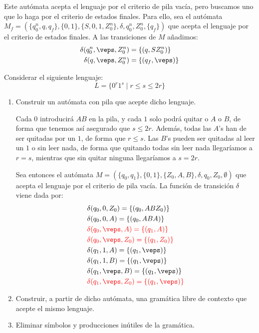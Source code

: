 \begin{ejercicio}
\begin{enumerate}
        Este autómata acepta el lenguaje por el criterio de pila vacía, pero buscamos uno que lo haga por el criterio de estados finales. Para ello, sea el autómata $M_f = (\{q_0^n, q, q_f\},\{0,1\},\{S,0,1, Z_0^n\},\delta,q_0^n,Z_0^n,\{q_f\})$ que acepta el lenguaje por el criterio de estados finales. A las transiciones de $M$ añadimos:
        \begin{align*}
            \delta(q_0^n,\veps,Z_0^n) &= \{(q,SZ_0^n)\} \\
            \delta(q,\veps,Z_0^n) &= \{(q_f,\veps)\}
        \end{align*}
    \end{enumerate}
\end{ejercicio}

\begin{ejercicio}\label{ej:1.5.11}
    Considerar el siguiente lenguaje:
    \begin{equation*}
        L = \{0^r 1^s \mid r\leq s \leq 2r\}
    \end{equation*}
    \begin{enumerate}
        \item Construir un autómata con pila que acepte dicho lenguaje.
        
        Cada $0$ introducirá $AB$ en la pila, y cada $1$ solo podrá quitar o $A$ o $B$, de forma que tenemos así asegurado que $s\leq 2r$. Además, todas las $A$'s han de ser quitadas por un $1$, de forma que $r\leq s$. Las $B$'s pueden ser quitadas al leer un $1$ o sin leer nada, de forma que quitando todas sin leer nada llegaríamos a $r=s$, mientras que sin quitar ninguna llegaríamos a $s=2r$.

        Sea entonces el autómata $M = (\{q_0,q_1\},\{0,1\},\{Z_0,A,B\},\delta,q_0,Z_0,\emptyset)$ que acepta el lenguaje por el criterio de pila vacía. La función de transición $\delta$ viene dada por:
        \begin{align*}
            &\delta(q_0,0,Z_0) = \{(q_0,ABZ_0)\} \\
            &\delta(q_0,0,A) = \{(q_0,ABA)\} \\
            &\red{\delta(q_0,\veps,A) = \{(q_1,A)\}} \\
            &\red{\delta(q_0,\veps,Z_0) = \{(q_1,Z_0)\}} \\
            &\delta(q_1,1,A) = \{(q_1,\veps)\} \\
            &\delta(q_1,1,B) = \{(q_1,\veps)\} \\
            &\delta(q_1,\veps,B) = \{(q_1,\veps)\}\\
            &\red{\delta(q_1,\veps,Z_0) = \{(q_1,\veps)\}}
        \end{align*}
        \item Construir, a partir de dicho autómata, una gramática libre de contexto que acepte el mismo lenguaje.
        
        \item Eliminar símbolos y producciones inútiles de la gramática.
    \end{enumerate}
\end{ejercicio}

